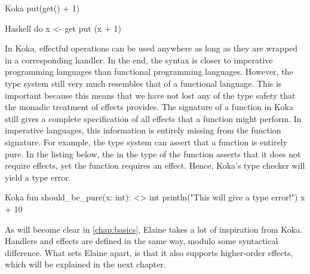 \begin{lst}{Koka}
put(get() + 1)
\end{lst}
\begin{lst}{Haskell}
do
  x <- get
  put (x + 1)
\end{lst}
%
In Koka, effectful operations can be used anywhere as long as they are wrapped in a corresponding handler. In the end, the syntax is closer to imperative programming languages than functional programming languages. However, the type system still very much resembles that of a functional language. This is important because this means that we have not lost any of the type safety that the monadic treatment of effects provides. The signature of a function in Koka still gives a complete specification of all effects that a function might perform. In imperative languages, this information is entirely missing from the function signature. For example, the type system can assert that a function is entirely pure. In the listing below, the \hs{<>} in the type of the function asserts that it does not require effects, yet the  function requires an effect. Hence, Koka's type checker will yield a type error.

\begin{lst}{Koka}
fun should_be_pure(x: int): <> int
  println("This will give a type error!")
  x + 10
\end{lst}
%
As will become clear in \cref{chap:basics}, Elaine takes a lot of inspiration from Koka. Handlers and effects are defined in the same way, modulo some syntactical difference. What sets Elaine apart, is that it also supports higher-order effects, which will be explained in the next chapter.
